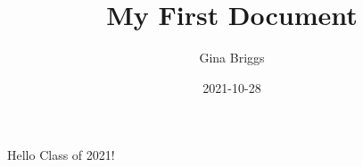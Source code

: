 \documentclass{article}
\title{My First Document}
\date{2021-10-28}
\author{Gina Briggs}
\begin{document}
	\maketitle
	\newpage
	Hello Class of 2021!
\end{document}

